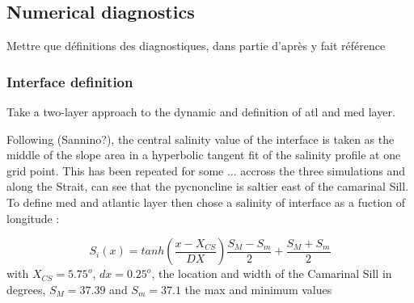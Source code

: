 



\subsection{Numerical diagnostics}
Mettre que définitions des diagnostiques, dans partie d'après y fait référence

\subsubsection{Interface definition}

Take a two-layer approach to the dynamic and definition of atl and med layer.

Following (Sannino?), the central salinity value of the interface is taken as the middle of the slope area in a hyperbolic tangent fit of the salinity profile at one grid point. This has been repeated for some ... accross the three simulations and along the Strait, can see that the pycnoncline is saltier east of the camarinal Sill. To define med and atlantic layer then chose a salinity of interface as a fuction of longitude :

\begin{equation}
	S_i(x)=tanh(\frac{x-X_{CS}}{DX})\frac{S_M-S_m}{2}+\frac{S_M+S_m}{2}
\end{equation}
with $X_{CS}=5.75^o$, $dx=0.25^o$, the location and width of the Camarinal Sill in degrees, $S_M=37.39$ and $S_m=37.1$ the max and minimum values

